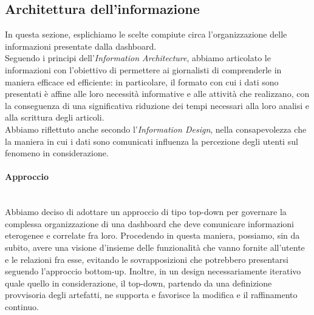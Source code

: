 \subsection{Architettura dell'informazione}

In questa sezione, esplichiamo le scelte compiute circa l'organizzazione delle informazioni presentate dalla dashboard.\\
Seguendo i principi dell'\textit{Information Architecture}, abbiamo articolato le informazioni con l'obiettivo di permettere ai giornalisti di comprenderle in maniera efficace ed efficiente: in particolare, il formato con cui i dati sono presentati è affine alle loro necessità informative e alle attività che realizzano, con la conseguenza di una significativa riduzione dei tempi necessari alla loro analisi e alla scrittura degli articoli.\\
\noindent
Abbiamo riflettuto anche secondo l'\textit{Information Design}, nella consapevolezza che la maniera in cui i dati sono comunicati influenza la percezione degli utenti sul fenomeno in considerazione.

\paragraph{Approccio}\mbox{}\\
Abbiamo deciso di adottare un approccio di tipo top-down per governare la complessa organizzazione di una dashboard che deve comunicare informazioni eterogenee e correlate fra loro.
Procedendo in questa maniera, possiamo, sin da subito, avere una visione d'insieme delle funzionalità che vanno fornite all'utente e le relazioni fra esse, evitando le sovrapposizioni che potrebbero presentarsi seguendo l'approccio bottom-up.
Inoltre, in un design necessariamente iterativo quale quello in considerazione, il top-down, partendo da una definizione provvisoria degli artefatti, ne supporta e favorisce la modifica e il raffinamento continuo.

